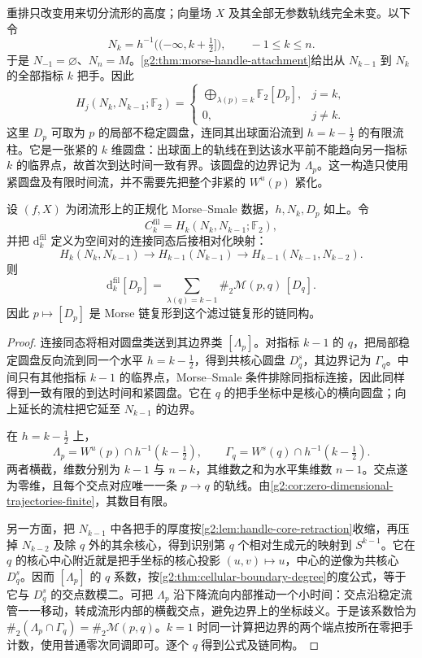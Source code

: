 重排只改变用来切分流形的高度；向量场 \(X\) 及其全部无参数轨线完全未变。以下令
\[
	N_k=h^{-1}\bigl((-\infty,k+\tfrac12]\bigr),
	\qquad -1\le k\le n.
\]
于是 \(N_{-1}=\varnothing\)、\(N_n=M\)。\cref{g2:thm:morse-handle-attachment}给出从 \(N_{k-1}\) 到 \(N_k\) 的全部指标 \(k\) 把手。因此
\[
	H_j(N_k,N_{k-1};\mathbb F_2)=
	\begin{cases}
		\displaystyle\bigoplus_{\lambda(p)=k}\mathbb F_2[D_p],&j=k,\\
		0,&j\ne k.
	\end{cases}
\]
这里 \(D_p\) 可取为 \(p\) 的局部不稳定圆盘，连同其出球面沿流到 \(h=k-\frac12\) 的有限流柱。它是一张紧的 \(k\) 维圆盘：出球面上的轨线在到达该水平前不能趋向另一指标 \(k\) 的临界点，故首次到达时间一致有界。该圆盘的边界记为 \(\Lambda_p\)。这一构造只使用紧圆盘及有限时间流，并不需要先把整个非紧的 \(W^u(p)\) 紧化。

\begin{proposition}\label{g2:prop:morse-handle-incidence}
	设 \((f,X)\) 为闭流形上的正规化 Morse--Smale 数据，\(h,N_k,D_p\) 如上。令
	\[
		C_k^{\mathrm{fil}}=H_k(N_k,N_{k-1};\mathbb F_2),
	\]
	并把 \(\mathrm d_k^{\mathrm{fil}}\) 定义为空间对的连接同态后接相对化映射：
	\[
		H_k(N_k,N_{k-1})\longrightarrow H_{k-1}(N_{k-1})
		\longrightarrow H_{k-1}(N_{k-1},N_{k-2}).
	\]
	则
	\begin{equation}\label{g2:eq:morse-handle-incidence}
		\mathrm d_k^{\mathrm{fil}}[D_p]
		=\sum_{\lambda(q)=k-1}\#_2\mathcal M(p,q)\,[D_q].
	\end{equation}
	因此 \(p\mapsto[D_p]\) 是 Morse 链复形到这个滤过链复形的链同构。
\end{proposition}
\begin{proof}
	连接同态将相对圆盘类送到其边界类 \([\Lambda_p]\)。对指标 \(k-1\) 的 \(q\)，把局部稳定圆盘反向流到同一个水平 \(h=k-\frac12\)，得到共核心圆盘 \(D_q^s\)，其边界记为 \(\Gamma_q\)。中间只有其他指标 \(k-1\) 的临界点，Morse--Smale 条件排除同指标连接，因此同样得到一致有限的到达时间和紧圆盘。它在 \(q\) 的把手坐标中是核心的横向圆盘；向上延长的流柱把它延至 \(N_{k-1}\) 的边界。

	在 \(h=k-\frac12\) 上，
	\[
		\Lambda_p=W^u(p)\cap h^{-1}(k-\tfrac12),\qquad
		\Gamma_q=W^s(q)\cap h^{-1}(k-\tfrac12).
	\]
	两者横截，维数分别为 \(k-1\) 与 \(n-k\)，其维数之和为水平集维数 \(n-1\)。交点遂为零维，且每个交点对应唯一一条 \(p\to q\) 的轨线。由\cref{g2:cor:zero-dimensional-trajectories-finite}，其数目有限。

	另一方面，把 \(N_{k-1}\) 中各把手的厚度按\cref{g2:lem:handle-core-retraction}收缩，再压掉 \(N_{k-2}\) 及除 \(q\) 外的其余核心，得到识别第 \(q\) 个相对生成元的映射到 \(S^{k-1}\)。它在 \(q\) 的核心中心附近就是把手坐标的核心投影 \((u,v)\mapsto u\)，中心的逆像为共核心 \(D_q^s\)。因而 \([\Lambda_p]\) 的 \(q\) 系数，按\cref{g2:thm:cellular-boundary-degree}的度公式，等于它与 \(D_q^s\) 的交点数模二。可把 \(\Lambda_p\) 沿下降流向内部推动一个小时间：交点沿稳定流管一一移动，转成流形内部的横截交点，避免边界上的坐标歧义。于是该系数恰为 \(\#_2(\Lambda_p\cap\Gamma_q)=\#_2\mathcal M(p,q)\)。\(k=1\) 时同一计算把边界的两个端点按所在零把手计数，使用普通零次同调即可。逐个 \(q\) 得到公式及链同构。
\end{proof}

